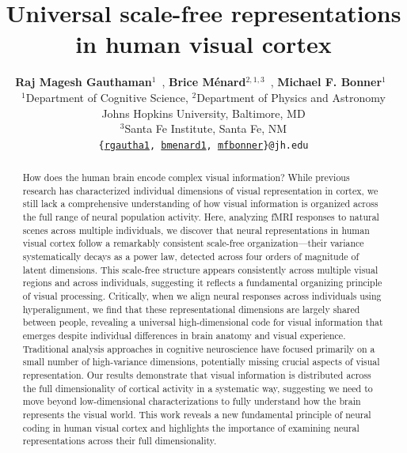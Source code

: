 \documentclass[10pt]{article}
\title{Universal scale-free representations\\in human visual cortex}
\author{
    \textbf{Raj Magesh Gauthaman$^1$}~\orcidlink{0000-0001-7121-1532},
    \textbf{Brice Ménard$^{2,1,3}$}~\orcidlink{0000-0003-3164-6974},
    \textbf{Michael F. Bonner$^1$}~\orcidlink{0000-0002-4992-674X}\\
    $^1$Department of Cognitive Science,
    $^2$Department of Physics and Astronomy\\
    Johns Hopkins University, Baltimore, MD\\
    $^3$Santa Fe Institute, Santa Fe, NM\\
    \texttt{\{\href{mailto:rgautha1@jh.edu}{rgautha1}, \href{mailto:bmenard1@jh.edu}{bmenard1}, \href{mailto:mfbonner@jh.edu}{mfbonner}\}@jh.edu}
}
\date{}
\begin{document}
\maketitle

\begin{abstract}
    How does the human brain encode complex visual information? While previous research has characterized individual dimensions of visual representation in cortex, we still lack a comprehensive understanding of how visual information is organized across the full range of neural population activity. Here, analyzing fMRI responses to natural scenes across multiple individuals, we discover that neural representations in human visual cortex follow a remarkably consistent scale-free organization—their variance systematically decays as a power law, detected across four orders of magnitude of latent dimensions. This scale-free structure appears consistently across multiple visual regions and across individuals, suggesting it reflects a fundamental organizing principle of visual processing. Critically, when we align neural responses across individuals using hyperalignment, we find that these representational dimensions are largely shared between people, revealing a universal high-dimensional code for visual information that emerges despite individual differences in brain anatomy and visual experience. Traditional analysis approaches in cognitive neuroscience have focused primarily on a small number of high-variance dimensions, potentially missing crucial aspects of visual representation. Our results demonstrate that visual information is distributed across the full dimensionality of cortical activity in a systematic way, suggesting we need to move beyond low-dimensional characterizations to fully understand how the brain represents the visual world. This work reveals a new fundamental principle of neural coding in human visual cortex and highlights the importance of examining neural representations across their full dimensionality.
\end{abstract}
\end{document}
